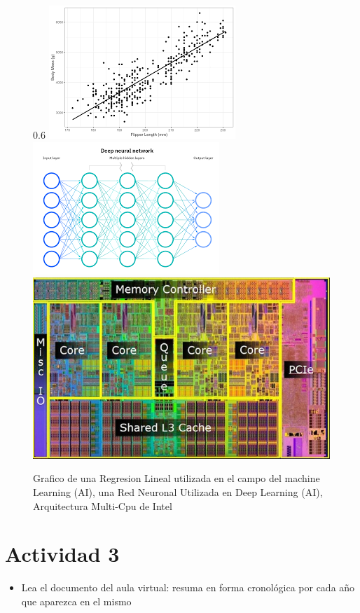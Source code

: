 \documentclass[11pt]{article}
\begin{document}
\begin{multicols}{2}
\begin{figure}{0.6\linewidth}
  \centering
  \includegraphics[width=0.6\linewidth]{linear.png}
  \includegraphics[width=0.6\linewidth]{neural.png}
  \includegraphics[width=0.6\linewidth]{mcpu.jpg}
    \caption{Grafico de una Regresion Lineal utilizada en el campo del machine Learning (AI), una Red Neuronal Utilizada en Deep Learning (AI), Arquitectura Multi-Cpu de Intel}
  
  \end{figure} 
  
\section{Actividad 3}
\label{sec:2}

\begin{itemize}
 \item Lea el documento del aula virtual: resuma en forma cronológica por cada año que aparezca en el mismo


\end{itemize}
\end{multicols}
\end{document}
